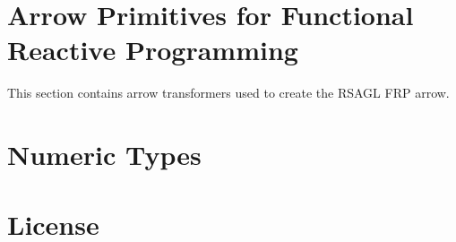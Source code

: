 \documentclass{article}
\begin{document}
\part{Arrow Primitives for Functional Reactive Programming}

This section contains arrow transformers used to create the RSAGL FRP arrow.






\part{Numeric Types}




\part{License}


\end{document}
